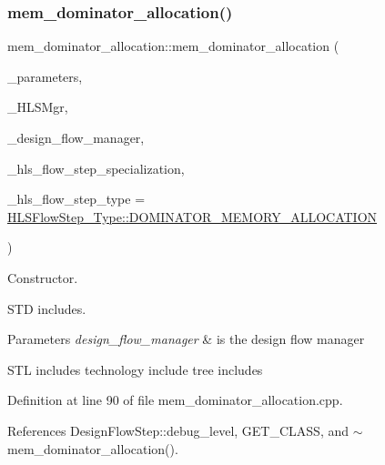 \subsubsection{\texorpdfstring{mem\+\_\+dominator\+\_\+allocation()}{mem\_dominator\_allocation()}}
{\footnotesize\ttfamily mem\+\_\+dominator\+\_\+allocation\+::mem\+\_\+dominator\+\_\+allocation (\begin{DoxyParamCaption}\item[{const \hyperlink{Parameter_8hpp_a37841774a6fcb479b597fdf8955eb4ea}{Parameter\+Const\+Ref}}]{\+\_\+parameters,  }\item[{const \hyperlink{hls__manager_8hpp_acd3842b8589fe52c08fc0b2fcc813bfe}{H\+L\+S\+\_\+manager\+Ref}}]{\+\_\+\+H\+L\+S\+Mgr,  }\item[{const Design\+Flow\+Manager\+Const\+Ref}]{\+\_\+design\+\_\+flow\+\_\+manager,  }\item[{const \hyperlink{hls__step_8hpp_a5fdd2edf290c196531d21d68e13f0e74}{H\+L\+S\+Flow\+Step\+Specialization\+Const\+Ref}}]{\+\_\+hls\+\_\+flow\+\_\+step\+\_\+specialization,  }\item[{const \hyperlink{hls__step_8hpp_ada16bc22905016180e26fc7e39537f8d}{H\+L\+S\+Flow\+Step\+\_\+\+Type}}]{\+\_\+hls\+\_\+flow\+\_\+step\+\_\+type = {\ttfamily \hyperlink{hls__step_8hpp_ada16bc22905016180e26fc7e39537f8da3390f601e994d8e4078c5d5fd2b42313}{H\+L\+S\+Flow\+Step\+\_\+\+Type\+::\+D\+O\+M\+I\+N\+A\+T\+O\+R\+\_\+\+M\+E\+M\+O\+R\+Y\+\_\+\+A\+L\+L\+O\+C\+A\+T\+I\+ON}} }\end{DoxyParamCaption})}



Constructor. 

S\+TD includes.


\begin{DoxyParams}{Parameters}
{\em design\+\_\+flow\+\_\+manager} & is the design flow manager\\
\hline
\end{DoxyParams}
S\+TL includes technology include tree includes 

Definition at line 90 of file mem\+\_\+dominator\+\_\+allocation.\+cpp.



References Design\+Flow\+Step\+::debug\+\_\+level, G\+E\+T\+\_\+\+C\+L\+A\+SS, and $\sim$mem\+\_\+dominator\+\_\+allocation().

